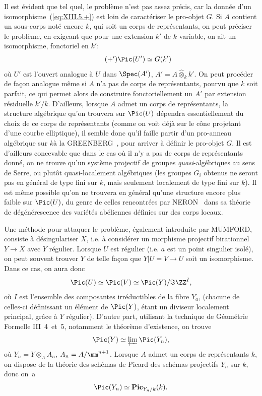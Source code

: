 Il est \'evident que tel quel, le probl\`eme n'est pas assez pr\'ecis, car la donn\'ee d'un isomorphisme~(\ref{eq:XIII.5.+}) est loin de caract\'eriser le pro-objet $G$. Si $A$ contient un sous-corps not\'e encore $k$, qui soit un corps de repr\'esentants, on peut pr\'eciser le probl\`eme, en exigeant que pour une extension $k'$ de $k$ variable, on ait un isomorphisme, fonctoriel en $k'$: \begin{equation*} \label{eq:XIII.5.+'} \tag{$+'$} {\Pic(U')\simeq G(k')} \end{equation*} o\`u $U'$ est l'ouvert analogue \`a $U$ dans $\Spec(A')$, $A'=A\hat{\otimes}_k k'$. On peut proc\'eder de fa\c con analogue m\^eme si $A$ n'a pas de corps de repr\'esentants, pourvu que $k$ soit parfait, ce qui permet alors de construire fonctoriellement un $A'$ \og par extension r\'esiduelle $k'/k$\fg. D'ailleurs, lorsque $A$ admet un corps de repr\'esentants, la structure alg\'ebrique qu'on trouvera sur $\Pic(U)$ d\'ependra essentiellement du choix de ce corps de repr\'esentants (comme on voit d\'ej\`a sur le c\^{o}ne projetant d'une courbe elliptique), il semble donc qu'il faille partir d'un \og pro-anneau alg\'ebrique sur $k$\fg \`a la GREENBERG~\cite{XIII.3}, pour arriver \`a d\'efinir le pro-objet $G$. Il est d'ailleurs concevable que dans le cas o\`u il n'y a pas de corps de repr\'esentants donn\'e, on ne trouve qu'un syst\`eme projectif de groupes \emph{quasi}-alg\'ebriques au sens de Serre, ou plut\^{o}t quasi-localement alg\'ebriques (les groupes $G_i$ obtenus ne seront pas en g\'en\'eral de type fini sur $k$, mais seulement localement de type fini sur $k$). Il est m\^eme possible qu'on ne trouvera en g\'en\'eral qu'une structure encore plus faible sur $\Pic(U)$, du genre de celles rencontr\'ees par NERON~\cite{XIII.6} dans sa th\'eorie de d\'eg\'en\'erescence des vari\'et\'es ab\'eliennes d\'efinies sur des corps locaux.

Une m\'ethode pour attaquer le probl\`eme, \'egalement introduite par MUMFORD, consiste \`a d\'esingulariser $X$, i.e. \`a consid\'erer un morphisme projectif birationnel $Y\to X$ avec $Y$ r\'egulier. Lorsque $U$ est r\'egulier (i.e. $a$ est un point singulier isol\'e), on peut souvent trouver $Y$ de telle fa\c con que $Y|U=V\to U$ soit un isomorphisme. Dans ce cas, on aura donc $$ \Pic(U)\simeq\Pic(V)\simeq\Pic(Y)/\Im \ZZ^I, $$ o\`u $I$ est l'ensemble des composantes irr\'eductibles de la fibre $Y_{a}$,  (chacune de celles-ci d\'efinissant un \'el\'ement de $\Pic(Y)$, \'etant un diviseur localement principal, gr\^ace \`a $Y$ r\'egulier). D'autre part, utilisant la technique de G\'eom\'etrie Formelle \EGA III~4~et~5, notamment le th\'eor\`eme d'existence, on trouve $$ \Pic(Y)\simeq\varprojlim\Pic(Y_n), $$ o\`u $Y_n=Y\otimes_A A_n$, $A_n=A/\mm^{n+1}$. Lorsque $A$ admet un corps de repr\'esentants $k$, on dispose de la th\'eorie des sch\'emas de Picard des sch\'emas projectifs $Y_n$ sur $k$, donc on~a $$ \Pic(Y_n)\simeq \mathbf{Pic}_{Y_n/k}(k). $$


